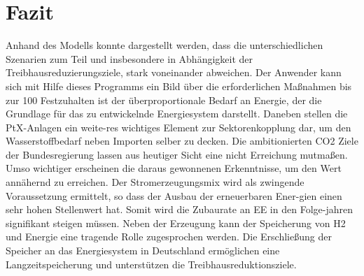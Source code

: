 \section{Fazit}
Anhand des Modells konnte dargestellt werden, dass die unterschiedlichen Szenarien zum Teil und insbesondere in Abhängigkeit der Treibhausreduzierungsziele, stark voneinander abweichen. Der Anwender kann sich mit Hilfe dieses Programms ein Bild über die erforderlichen Maßnahmen bis zur 100 %
Festzuhalten ist der überproportionale Bedarf an Energie, der die Grundlage für das zu entwickelnde Energiesystem darstellt. Daneben stellen die PtX-Anlagen ein weite-res wichtiges Element zur Sektorenkopplung dar, um den Wasserstoffbedarf neben Importen selber zu decken. 
Die ambitionierten CO2 Ziele der Bundesregierung lassen aus heutiger Sicht eine nicht Erreichung mutmaßen. Umso wichtiger erscheinen die daraus gewonnenen Erkenntnisse, um den Wert annähernd zu erreichen. Der Stromerzeugungsmix wird als zwingende Voraussetzung ermittelt, so dass der Ausbau der erneuerbaren Ener-gien einen sehr hohen Stellenwert hat. Somit wird die Zubaurate an EE in den Folge-jahren signifikant steigen müssen. 
Neben der Erzeugung kann der Speicherung von H2 und Energie eine tragende Rolle zugesprochen werden. Die Erschließung der Speicher an das Energiesystem in Deutschland ermöglichen eine Langzeitspeicherung und unterstützen die Treibhausreduktionsziele. 
